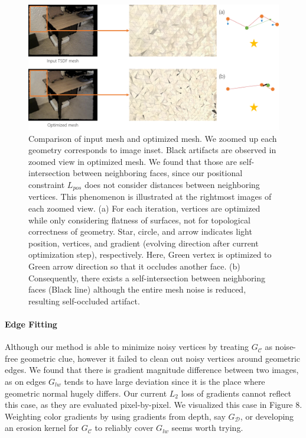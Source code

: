\begin{figure}
    \includegraphics[width=\textwidth]{figures/4_future_work_self_intersection.png}
    \caption{Comparison of input mesh and optimized mesh. We zoomed up each geometry corresponds to image inset. 
    Black artifacts are observed in zoomed view in optimized mesh. We found that those are self-intersection between neighboring faces, since our positional constraint $L_{pos}$ does not consider distances between neighboring vertices. 
    This phenomenon is illustrated at the rightmost images of each zoomed view. 
    (a) For each iteration, vertices are optimized while only considering flatness of surfaces, not for topological correctness of geometry. 
    Star, circle, and arrow indicates light position, vertices, and gradient (evolving direction after current optimization step), respectively. 
    Here, Green vertex is optimized to Green arrow direction so that it occludes another face. 
    (b) Consequently, there exists a self-intersection between neighboring faces (Black line) although the entire mesh noise is reduced, resulting self-occluded artifact.}
    \label{fig:seven}
\end{figure}

\paragraph{Edge Fitting}
Although our method is able to minimize noisy vertices by treating $G_\mathcal{C}$ as noise-free geometric clue, however it failed to clean out noisy vertices around geometric edges. 
We found that there is gradient magnitude difference between two images, as on edges $G_{lw}$ tends to have large deviation since it is the place where geometric normal hugely differs. 
Our current $L_2$ loss of gradients cannot reflect this case, as they are evaluated pixel-by-pixel. 
We visualized this case in Figure 8. 
Weighting color gradients by using gradients from depth, say $G_\mathcal{D}$, or developing an erosion kernel for $G_\mathcal{C}$ to reliably cover $G_{lw}$ seems worth trying.


